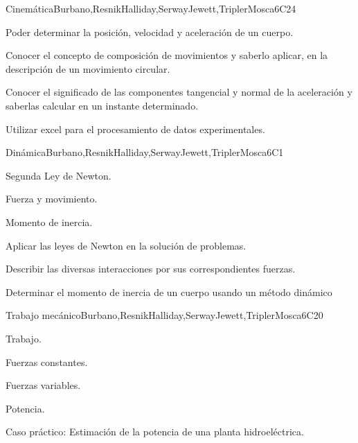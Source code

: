 \begin{syllabus}
\begin{unit}{}{Cinemática}{Burbano,ResnikHalliday,SerwayJewett,TriplerMosca}{6}{C24}
      \begin{learningoutcomes}
         \item Poder determinar la posición, velocidad y aceleración de un cuerpo.
         \item Conocer el concepto de composición de movimientos y saberlo aplicar, en la descripción de un movimiento circular.
         \item Conocer el significado de las componentes tangencial y normal de la aceleración y saberlas calcular en un instante determinado. 
         \item Utilizar excel para el procesamiento de datos experimentales.
      \end{learningoutcomes}
   \end{unit}
   
   \begin{unit}{}{Dinámica}{Burbano,ResnikHalliday,SerwayJewett,TriplerMosca}{6}{C1}
   \begin{topics}
         \item Segunda Ley de Newton.
         \item Fuerza y movimiento.
         \item Momento de inercia.
      \end{topics}
   
      \begin{learningoutcomes}
         \item Aplicar las leyes de Newton en la solución de problemas.
         \item Describir las diversas interacciones por sus correspondientes fuerzas.
         \item Determinar el momento de inercia de un cuerpo usando un método dinámico
      \end{learningoutcomes}
   \end{unit}
   
   \begin{unit}{}{Trabajo mecánico}{Burbano,ResnikHalliday,SerwayJewett,TriplerMosca}{6}{C20}
   \begin{topics}
         \item Trabajo.
         \item Fuerzas constantes.
         \item Fuerzas variables.
         \item Potencia.
         \item Caso práctico: Estimación de la potencia de una planta hidroeléctrica.
     \end{topics}
   

\end{unit}
\end{syllabus}
